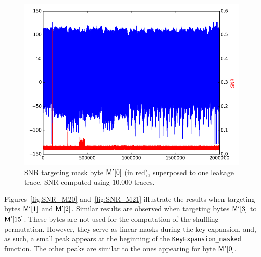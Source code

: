 \begin{figure}[H]
	\centering 
	\includegraphics[scale=0.35]{figures/2Mpts/SNR_M19_10ktraces.png}
	\caption{SNR targeting mask byte $\mathsf{M'}[0]$ (in red), superposed to one leakage trace. SNR computed using $10.000$ traces.}
	\label{fig:SNR_M19}
\end{figure}

Figures~\ref{fig:SNR_M20} and~\ref{fig:SNR_M21} illustrate the results when targeting bytes $\mathsf{M'}[1]$ and $\mathsf{M'}[2]$.  Similar results are observed when targeting bytes $\mathsf{M'}[3]$ to $\mathsf{M'}[15]$.
These bytes are not used for the computation of the shuffling permutation. However, they  serve as linear masks during the key expansion, and, as such, a small peak appears at the beginning of the \texttt{KeyExpansion\_masked} function.
The other peaks are similar to the ones appearing for byte $\mathsf{M'}[0]$.

